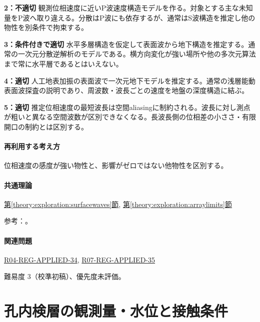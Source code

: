\noindent\textbf{2：不適切} 観測位相速度に近いP波速度構造モデルを作る。対象とする主な未知量をP波へ取り違える。分散はP波にも依存するが、通常はS波構造を推定し他の物性を別条件で拘束する。\par

\noindent\textbf{3：条件付きで適切} 水平多層構造を仮定して表面波から地下構造を推定する。通常の一次元分散逆解析のモデルである。横方向変化が強い場所や他の多次元算法まで常に水平層であるとはいえない。\par

\noindent\textbf{4：適切} 人工地表加振の表面波で一次元地下モデルを推定する。通常の浅層能動表面波探査の説明であり、周波数・波長ごとの速度を地盤の深度構造に結ぶ。\par

\noindent\textbf{5：適切} 推定位相速度の最短波長は空間aliasingに制約される。波長に対し測点が粗いと異なる空間波数が区別できなくなる。長波長側の位相差の小ささ・有限開口の制約とは区別する。\par

\paragraph{再利用する考え方} 位相速度の感度が強い物性と、影響がゼロではない他物性を区別する。

\paragraph{共通理論} \hyperref[theory:exploration:surfacewaves]{第\ref*{theory:exploration:surfacewaves}節}, \hyperref[theory:exploration:arraylimits]{第\ref*{theory:exploration:arraylimits}節}

\par 参考：\cite{epa_surfacewaves,xia_rayleigh1999,japansea_spac2017,array_limits2002}。

\paragraph{関連問題} \hyperref[q:r04-reg-applied-34]{R04-REG-APPLIED-34}, \hyperref[q:r07-reg-applied-35]{R07-REG-APPLIED-35}

\par 難易度 3（校準初稿）、優先度未評価。

\section{孔内検層の観測量・水位と接触条件}

